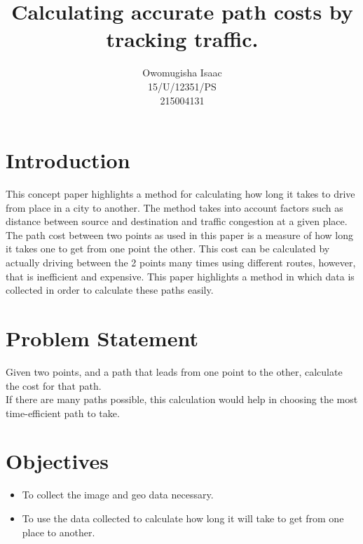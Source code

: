\documentclass[11pt]{article}
\title{Calculating accurate path costs by tracking traffic.}
\author{Owomugisha Isaac \\ 15/U/12351/PS \\ 215004131}
\begin{document}
\maketitle

\section{Introduction}
This concept paper highlights a method for calculating how long it takes to drive from place in a city to another. The method takes into account factors such as distance between source and destination and traffic congestion at a given place.\\
The path cost between two points as used in this paper is a measure of how long it takes one to get from one point the other. This cost can be calculated by actually driving between the 2 points many times using different routes, however, that is inefficient and expensive. This paper highlights a method in which data is collected in order to calculate these paths easily.

\section{Problem Statement}
Given two points, and a path that leads from one point to the other, calculate the cost for that path. \\
If there are many paths possible, this calculation would help in choosing the most time-efficient path to take.

\section{Objectives}
\begin{itemize}
\item To collect the image and geo data necessary.
\item To use the data collected to calculate how long it will take to get from one place to another.
\end{itemize}
\end{document}
